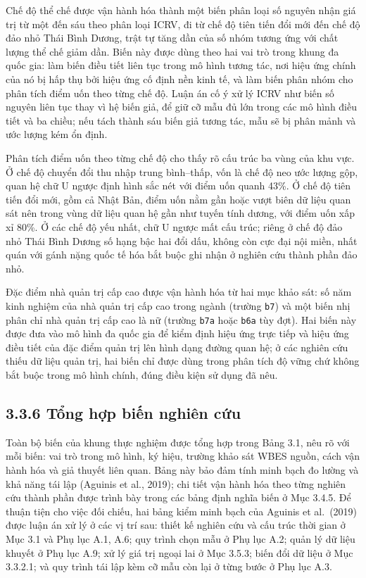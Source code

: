 \documentclass[
  a4paper,
  13pt]{extreport}
\begin{document}
Chế độ thể chế được vận hành hóa thành một biến phân loại số nguyên nhận
giá trị từ một đến sáu theo phân loại ICRV, đi từ chế độ tiên tiến đổi
mới đến chế độ đảo nhỏ Thái Bình Dương, trật tự tăng dần của số nhóm
tương ứng với chất lượng thể chế giảm dần. Biến này được dùng theo hai
vai trò trong khung đa quốc gia: làm biến điều tiết liên tục trong mô
hình tương tác, nơi hiệu ứng chính của nó bị hấp thụ bởi hiệu ứng cố
định nền kinh tế, và làm biến phân nhóm cho phân tích điểm uốn theo từng
chế độ. Luận án cố ý xử lý ICRV như biến số nguyên liên tục thay vì hệ
biến giả, để giữ cỡ mẫu đủ lớn trong các mô hình điều tiết và ba chiều;
nếu tách thành sáu biến giả tương tác, mẫu sẽ bị phân mảnh và ước lượng
kém ổn định.

Phân tích điểm uốn theo từng chế độ cho thấy rõ cấu trúc ba vùng của khu
vực. Ở chế độ chuyển đổi thu nhập trung bình--thấp, vốn là chế độ neo
ước lượng gộp, quan hệ chữ U ngược định hình sắc nét với điểm uốn quanh
43\%. Ở chế độ tiên tiến đổi mới, gồm cả Nhật Bản, điểm uốn nằm gần hoặc
vượt biên dữ liệu quan sát nên trong vùng dữ liệu quan hệ gần như tuyến
tính dương, với điểm uốn xấp xỉ 80\%. Ở các chế độ yếu nhất, chữ U ngược
mất cấu trúc; riêng ở chế độ đảo nhỏ Thái Bình Dương số hạng bậc hai đổi
dấu, không còn cực đại nội miền, nhất quán với gánh nặng quốc tế hóa bắt
buộc ghi nhận ở nghiên cứu thành phần đảo nhỏ.

Đặc điểm nhà quản trị cấp cao được vận hành hóa từ hai mục khảo sát: số
năm kinh nghiệm của nhà quản trị cấp cao trong ngành (trường
\texttt{b7}) và một biến nhị phân chỉ nhà quản trị cấp cao là nữ (trường
\texttt{b7a} hoặc \texttt{b6a} tùy đợt). Hai biến này được đưa vào mô
hình đa quốc gia để kiểm định hiệu ứng trực tiếp và hiệu ứng điều tiết
của đặc điểm quản trị lên hình dạng đường quan hệ; ở các nghiên cứu
thiếu dữ liệu quản trị, hai biến chỉ được dùng trong phân tích độ vững
chứ không bắt buộc trong mô hình chính, đúng điều kiện sử dụng đã nêu.

\hypertarget{tux1ed5ng-hux1ee3p-biux1ebfn-nghiuxean-cux1ee9u}{%
\subsection{3.3.6 Tổng hợp biến nghiên
cứu}\label{tux1ed5ng-hux1ee3p-biux1ebfn-nghiuxean-cux1ee9u}}

Toàn bộ biến của khung thực nghiệm được tổng hợp trong Bảng 3.1, nêu rõ
với mỗi biến: vai trò trong mô hình, ký hiệu, trường khảo sát WBES
nguồn, cách vận hành hóa và giả thuyết liên quan. Bảng này bảo đảm tính
minh bạch đo lường và khả năng tái lập (Aguinis et al., 2019); chi tiết
vận hành hóa theo từng nghiên cứu thành phần được trình bày trong các
bảng định nghĩa biến ở Mục 3.4.5. Để thuận tiện cho việc đối chiếu, hai
bảng kiểm minh bạch của Aguinis et al.~(2019) được luận án xử lý ở các
vị trí sau: thiết kế nghiên cứu và cấu trúc thời gian ở Mục 3.1 và Phụ
lục A.1, A.6; quy trình chọn mẫu ở Phụ lục A.2; quản lý dữ liệu khuyết ở
Phụ lục A.9; xử lý giá trị ngoại lai ở Mục 3.5.3; biến đổi dữ liệu ở Mục
3.3.2.1; và quy trình tái lập kèm cỡ mẫu còn lại ở từng bước ở Phụ lục
A.3.
\end{document}

